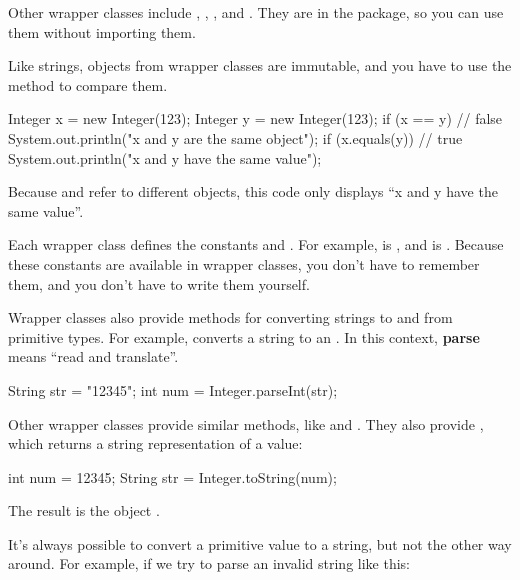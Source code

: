 Other wrapper classes include , , , and .
They are in the  package, so you can use them without importing them.

Like strings, objects from wrapper classes are immutable, and you have to use the  method to compare them.

\begin{code}
Integer x = new Integer(123);
Integer y = new Integer(123);
if (x == y) {                     // false
    System.out.println("x and y are the same object");
}
if (x.equals(y)) {                // true
    System.out.println("x and y have the same value");
}
\end{code}

Because  and  refer to different objects, this code only displays ``x and y have the same value''.

Each wrapper class defines the constants  and .
For example,  is , and  is .
Because these constants are available in wrapper classes, you don't have to remember them, and you don't have to write them yourself.


Wrapper classes also provide methods for converting strings to and from primitive types.
For example,  converts a string to an .
In this context, {\bf parse} means ``read and translate''.

\begin{code}
String str = "12345";
int num = Integer.parseInt(str);
\end{code}

Other wrapper classes provide similar methods, like  and .
They also provide , which returns a string representation of a value:

\begin{code}
int num = 12345;
String str = Integer.toString(num);
\end{code}

The result is the  object .


It's always possible to convert a primitive value to a string, but not the other way around.  For example, if we try to parse an invalid string like this:

